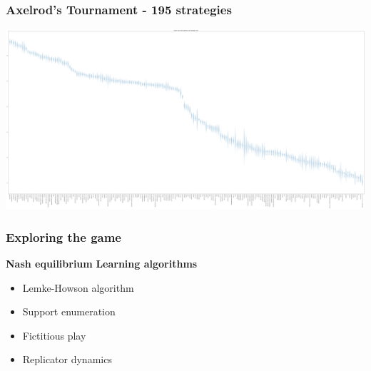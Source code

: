 \begin{frame}
    \begin{center}
        \frametitle{Axelrod's Tournament - 195 strategies}
        \includegraphics[width=\textwidth, trim=0 0 0 23, clip]{Bin/fulltournament.pdf}
    \end{center}
\end{frame}


\begin{frame}
    \frametitle{Exploring the game}
    
    \large
    \textbf{Nash equilibrium}
    \hspace{2cm}
    \textbf{Learning algorithms}

    \normalsize
    \vspace{0.5cm}
    \begin{multicols}{2}
        \begin{itemize}
            \item Lemke-Howson algorithm
            \vspace{0.5cm}
            \item Support enumeration

            \item Fictitious play
            \vspace{0.5cm}
            \item Replicator dynamics
        \end{itemize}
    \end{multicols}
\end{frame}


